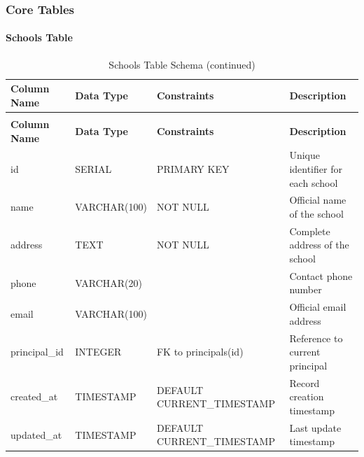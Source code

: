 \documentclass[12pt,a4paper]{report}
\begin{document}
\subsubsection{Core Tables}

\paragraph{Schools Table}
\begin{longtable}{|p{3cm}|p{3cm}|p{2cm}|p{6cm}|}
\caption{Schools Table Schema}
\label{tab:schools}\\
\hline
\textbf{Column Name} & \textbf{Data Type} & \textbf{Constraints} & \textbf{Description} \\
\hline
\endfirsthead
\caption[]{Schools Table Schema (continued)}\\
\hline
\textbf{Column Name} & \textbf{Data Type} & \textbf{Constraints} & \textbf{Description} \\
\hline
\endhead
id & SERIAL & PRIMARY KEY & Unique identifier for each school \\
\hline
name & VARCHAR(100) & NOT NULL & Official name of the school \\
\hline
address & TEXT & NOT NULL & Complete address of the school \\
\hline
phone & VARCHAR(20) & & Contact phone number \\
\hline
email & VARCHAR(100) & & Official email address \\
\hline
principal\_id & INTEGER & FK to principals(id) & Reference to current principal \\
\hline
created\_at & TIMESTAMP & DEFAULT CURRENT\_TIMESTAMP & Record creation timestamp \\
\hline
updated\_at & TIMESTAMP & DEFAULT CURRENT\_TIMESTAMP & Last update timestamp \\
\hline
\end{longtable}
\end{document}
